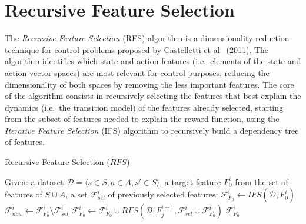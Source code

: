 \section{Recursive Feature Selection}
The \textit{Recursive Feature Selection} (RFS) \cite{castelletti2011tree} 
algorithm is a dimensionality reduction technique for control problems proposed
by Castelletti et al.\ (2011). 
The algorithm identifies which state and action features (i.e.\ elements of the 
state and action vector spaces) are most relevant for control purposes, reducing
the dimensionality of both spaces by removing the less important features.
The core of the algorithm consists in recursively selecting the features that 
best explain the dynamics (i.e.\ the transition model) of the features already 
selected, starting from the subset of features needed to explain the reward 
function, using the \textit{Iterative Feature Selection} (IFS) 
\cite{castelletti2013iter} algorithm to recursively build a dependency 
tree of features.
%
\begin{algorithm}
    \caption{Recursive Feature Selection ($RFS$)}
    \label{alg:RFS}
    \begin{algorithmic}
	\STATE Given: a dataset $\mathcal{D} = {\langle s \in S, a \in A, s' \in S \rangle}$, a target feature $F_0^i$ from the set of features of $S \cup A$, a set $\mathcal{F}_{sel}^i$ of previously selected features;
	\STATE $\mathcal{F}_{F_0}^i \leftarrow IFS(\mathcal{D}, F_0^i)$
	\STATE $\mathcal{F}_{new}^i \leftarrow \mathcal{F}_{F_0}^i \setminus \mathcal{F}_{sel}^i$
	    \STATE $\mathcal{F}_{F_0}^i \leftarrow \mathcal{F}_{F_0}^i \cup RFS(\mathcal{D}, F_j^{i+1}, \mathcal{F}_{sel}^i \cup \mathcal{F}_{F_0}^i)$
	\ENDFOR
	\RETURN $\mathcal{F}_{F_0}^i$
    \end{algorithmic}
\end{algorithm}
%

